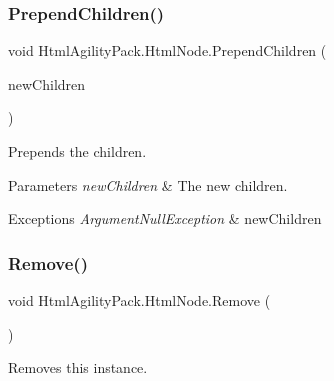 \subsubsection{\texorpdfstring{Prepend\+Children()}{PrependChildren()}}
{\footnotesize\ttfamily void Html\+Agility\+Pack.\+Html\+Node.\+Prepend\+Children (\begin{DoxyParamCaption}\item[{\hyperlink{class_html_agility_pack_1_1_html_node_collection}{Html\+Node\+Collection}}]{new\+Children }\end{DoxyParamCaption})\hspace{0.3cm}{\ttfamily [inline]}}



Prepends the children. 


\begin{DoxyParams}{Parameters}
{\em new\+Children} & The new children.\\
\hline
\end{DoxyParams}

\begin{DoxyExceptions}{Exceptions}
{\em Argument\+Null\+Exception} & new\+Children\\
\hline
\end{DoxyExceptions}
\mbox{\label{class_html_agility_pack_1_1_html_node_a5ce8d28c061c20981e8b1f9e44f27f95}} 
\subsubsection{\texorpdfstring{Remove()}{Remove()}}
{\footnotesize\ttfamily void Html\+Agility\+Pack.\+Html\+Node.\+Remove (\begin{DoxyParamCaption}{ }\end{DoxyParamCaption})\hspace{0.3cm}{\ttfamily [inline]}}



Removes this instance. 

\mbox{\label{class_html_agility_pack_1_1_html_node_a046ef0f6d482e429c4f48056a8464060}} 
